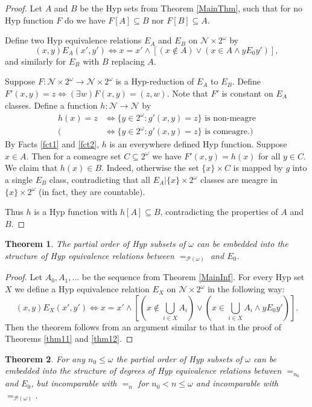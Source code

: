 \documentclass[11pt, english]{article}
\newtheorem{thm}{Theorem}
\newcommand{\baire}{\mathscr N}
\begin{document}
\begin{proof}
Let $A$ and $B$ be the Hyp sets from Theorem \ref{MainThm}, such
that for no Hyp function $F$ do we have $F[A]\subseteq B$ nor
$F[B]\subseteq A$.

Define two Hyp equivalence relations $E_{A}$ and $E_{B}$ on $\baire\times
2^\omega$ by
$$
(x,y) E_{A} (x',y')\iff x=x'\wedge[(x\notin A)\vee(x\in A\wedge yE_0 y')],
$$
and similarly for $E_B$ with $B$ replacing $A$.

Suppose $F:\baire\times 2^\omega\to\baire\times 2^\omega$ is a
Hyp-reduction of $E_{A}$ to $E_{B}$. Define $F'(x,y)=z\iff (\exists
w) F(x,y)=(z,w)$. Note that $F'$ is constant on $E_{A}$ classes.
Define a function $h:\baire\to \baire$ by
\begin{align*}
h(x)=z&\iff \{y\in 2^\omega: g'(x,y)=z\}\text{ is non-meagre}\\
      (&\iff \{y\in 2^\omega: g'(x,y)=z\}\text{ is comeagre.})
\end{align*}
By Facts \ref{fct1} and \ref{fct2}, $h$ is an everywhere defined Hyp
function. Suppose $x\in A$. Then for a comeagre set $C\subseteq
2^\omega$ we have $F'(x,y)=h(x)$ for all $y\in C$. We claim that
$h(x)\in B$. Indeed, otherwise the set $\{x\}\times C$ is mapped by
$g$ into a single $E_{B}$ class, contradicting that all
$E_{A}|\{x\}\times 2^\omega$ classes are meagre in $\{x\}\times
2^\omega$ (in fact, they are countable).

Thus $h$ is a Hyp function with $h[A]\subseteq B$, contradicting the
properties of $A$ and $B$.
\end{proof}

\begin{thm}
The partial order of Hyp subsets of $\omega$ can be embedded into
the structure of Hyp equivalence relations between
$=_{\mathcal{P}(\omega)}$ and $E_0$.
\end{thm}
\begin{proof}
Let $A_0, A_1,\ldots$ be the sequence from Theorem \ref{MainInf}.
For every Hyp set $X$ we define a Hyp equivalence relation $E_X$ on
$\baire\times 2^\omega$ in the following way:
$$
(x,y) E_{X} (x',y')\iff x=x'\wedge[(x\notin\bigcup_{i\in X} A_i)\vee(x\in\bigcup_{i\in X} A_i\wedge yE_0 y')].
$$
Then the theorem follows from an argument similar to that in the
proof of Theorems \ref{thm11} and \ref{thm12}.
\end{proof}

\begin{thm}
For any $n_0\leq\omega$ the partial order of Hyp subsets of $\omega$
can be embedded into the structure of degrees of Hyp equivalence
relations between $=_{n_0}$ and $E_0$, but incomparable with $=_n$
for $n_0<n\leq\omega$ and incomparable with
$=_{\mathcal{P}(\omega)}$.
\end{thm}
\end{document}

